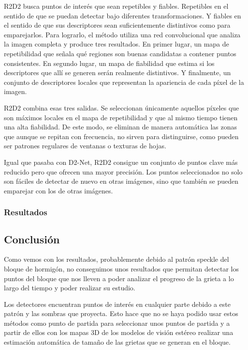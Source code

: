 R2D2 busca puntos de interés que sean repetibles y fiables. Repetibles en el sentido de que se puedan detectar bajo diferentes transformaciones. Y fiables en el sentido de que sus descriptores sean suficientemente distintivos como para emparejarlos. Para lograrlo, el método utiliza una red convolucional que analiza la imagen completa y produce tres resultados. En primer lugar, un mapa de repetibilidad que señala qué regiones son buenas candidatas a contener puntos consistentes. En segundo lugar, un mapa de fiabilidad que estima si los descriptores que allí se generen serán realmente distintivos. Y finalmente, un conjunto de descriptores locales que representan la apariencia de cada píxel de la imagen.  

R2D2 combina esas tres salidas. Se seleccionan únicamente aquellos píxeles que son máximos locales en el mapa de repetibilidad y que al mismo tiempo tienen una alta fiabilidad. De este modo, se eliminan de manera automática las zonas que aunque se repitan con frecuencia, no sirven para distinguirse, como pueden ser patrones regulares de ventanas o texturas de hojas.    

Igual que pasaba con D2-Net, R2D2 consigue un conjunto de puntos clave más reducido pero que ofrecen una mayor precisión. Los puntos seleccionados no solo son fáciles de detectar de nuevo en otras imágenes, sino que también se pueden emparejar con los de otras imágenes.


\subsubsection{Resultados}


\subsection{Conclusión}
Como vemos con los resultados, probablemente debido al patrón speckle del bloque de hormigón, no conseguimos unos resultados que permitan detectar los puntos del bloque que nos lleven a poder analizar el progreso de la grieta a lo largo del tiempo y poder realizar su estudio.

Los detectores encuentran puntos de interés en cualquier parte debido a este patrón y las sombras que proyecta. Esto hace que no se haya podido usar estos métodos como punto de partida para seleccionar unos puntos de partida y a partir de ellos con los mapas 3D de los modelos de visión estéreo realizar una estimación automática de tamaño de las grietas que se generan en el bloque.

